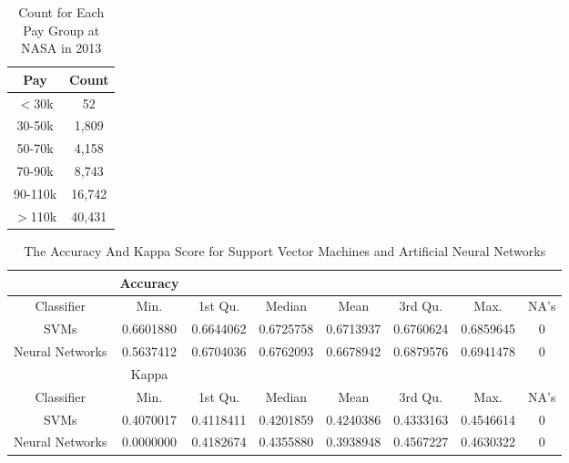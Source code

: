 \documentclass{article}
\begin{document}
    \begin{center}
        \begin{table}
            \centering
            \begin{tabular}{ |c|c| }
                \hline
                Pay & Count \\
                \hline
                $<$30k & 52 \\
                30-50k & 1,809 \\
                50-70k & 4,158 \\
                70-90k & 8,743 \\
                90-110k & 16,742 \\
                $>$110k & 40,431 \\
                \hline
            \end{tabular}
            \caption{Count for Each Pay Group at NASA in 2013}
            \label{tab:11}
        \end{table}
    \end{center}

    \begin{center}
        \begin{table}
            \centering
            \begin{tabular}{ |c|c|c|c|c|c|c|c| }
                \hline
                & Accuracy \\
                \hline
                Classifier & Min. & 1st Qu. & Median & Mean & 3rd Qu. & Max. & NA's \\
                SVMs & 0.6601880 & 0.6644062 & 0.6725758 & 0.6713937 & 0.6760624 & 0.6859645 & 0 \\
                Neural Networks & 0.5637412 & 0.6704036 & 0.6762093 & 0.6678942 & 0.6879576 & 0.6941478 & 0 \\
                \hline
                & Kappa \\
                \hline
                Classifier & Min. & 1st Qu. & Median & Mean & 3rd Qu. & Max. & NA's \\
                SVMs & 0.4070017 & 0.4118411 & 0.4201859 & 0.4240386 & 0.4333163 & 0.4546614 & 0 \\
                Neural Networks & 0.0000000 & 0.4182674 & 0.4355880 & 0.3938948 & 0.4567227 & 0.4630322 & 0 \\
                \hline
            \end{tabular}
            \caption{The Accuracy And Kappa Score for Support Vector Machines and Artificial Neural Networks}
            \label{tab:12}
        \end{table}
    \end{center}
\end{document}
